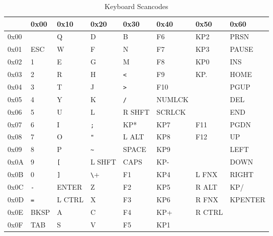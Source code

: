 \begin{table}[ht]
    \begin{center}
        \begin{tabular}{|l||l|l|l|l|l|l|l|} \hline
                 & 0x00     & 0x10      & 0x20      & 0x30     & 0x40   & 0x50   & 0x60    \\ \hline\hline
            0x00 &          &    Q      &    D      &    B     &   F6   &  KP2   & PRSN    \\ \hline
            0x01 & ESC      &    W      &    F      &    N     &   F7   &  KP3   & PAUSE   \\ \hline
            0x02 & 1	    &    E      & G         & M        & F8     &  KP0   & INS     \\ \hline
            0x03 & 2	    &    R      & H         & \verb+<+ & F9     &  KP.   & HOME    \\ \hline
            0x04 & 3	    &    T      & J         & \verb+>+ & F10    &        & PGUP    \\ \hline
            0x05 & 4	    &    Y      & K         & \verb+/+ & NUMLCK &        & DEL     \\ \hline
            0x06 & 5	    &    U      & L         & R SHFT   & SCRLCK &        & END     \\ \hline
            0x07 & 6	    &    I      & \verb+;+  & KP*      & KP7    & F11    & PGDN    \\ \hline
            0x08 & 7	    &    O      & \verb+"+  & L ALT    & KP8    & F12    & UP      \\ \hline
            0x09 & 8        &    P      & \verb+~+  & SPACE    & KP9    &        & LEFT    \\ \hline
            0x0A & 9        & \verb+[+  & L SHFT    & CAPS     & KP-    &        & DOWN    \\ \hline
            0x0B & 0        & \verb+]+  & \verb+\+  & F1       & KP4    & L FNX  & RIGHT   \\ \hline
            0x0C & \verb+-+ & ENTER     & Z         & F2       & KP5    & R ALT  & KP/     \\ \hline
            0x0D & \verb+=+ & L CTRL    & X         & F3       & KP6    & R FNX  & KPENTER \\ \hline
            0x0E & BKSP     & A         & C         & F4       & KP+    & R CTRL &         \\ \hline
            0x0F & TAB      & S         & V         & F5       & KP1    &        &         \\ \hline
        \end{tabular}
    \end{center}
    \caption{Keyboard Scancodes}
    \label{tbl:kbd_scancodes}
\end{table}

